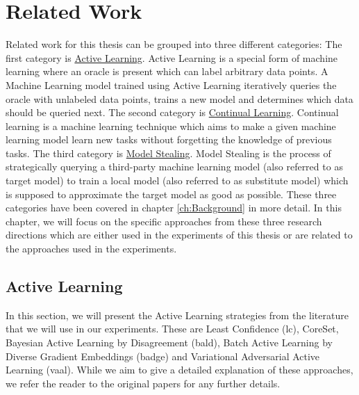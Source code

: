 
\chapter{Related Work}
\label{ch:Related_work}
Related work for this thesis can be grouped into three different categories: The first category is \hyperref[sec:Related_work:Active_Learning]
{Active Learning}. Active Learning is a special form of machine learning where an oracle is present which can label arbitrary data points.
A Machine Learning model trained using Active Learning iteratively queries the oracle with unlabeled data points, trains a new model and
determines which data should be queried next. The second category is \hyperref[sec:Related_work:Continual_Learning]{Continual Learning}.
Continual learning is a machine learning technique which aims to make a given machine learning model learn new tasks without forgetting
the knowledge of previous tasks. The third category is \hyperref[sec:Related_work:Model_Stealing]{Model Stealing}. Model Stealing is the process
of strategically querying a third-party machine learning model (also referred to as target model) to train a local model (also referred to as
substitute model) which is supposed to approximate the target model as good as possible. These three categories have been covered in chapter
\ref{ch:Background} in more detail. In this chapter, we will focus on the specific approaches from these three research directions which
are either used in the experiments of this thesis or are related to the approaches used in the experiments.

\section{Active Learning}
\label{sec:Related_work:Active_Learning}
In this section, we will present the Active Learning strategies from the literature that we will use in our experiments. These are Least Confidence
(\gls{lc}), CoreSet, Bayesian Active Learning by Disagreement (\gls{bald}), Batch Active Learning by Diverse Gradient Embeddings (\gls{badge}) and 
Variational Adversarial Active Learning (\gls{vaal}). While we aim to give a detailed explanation of these approaches, we refer the reader to the
original papers for any further details. \par

